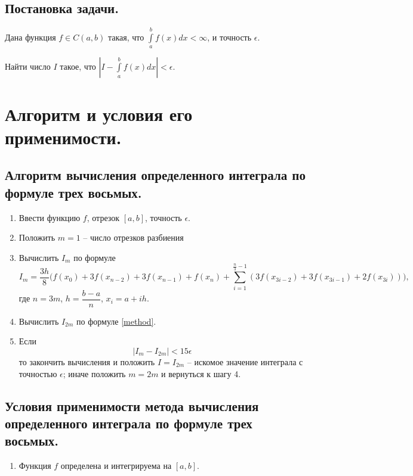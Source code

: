 \documentclass[a4paper, 12pt]{article}
\begin{document}
	\subsection{Постановка задачи.}
	
	Дана функция $f\in C(a,b)$ такая, что $\int\limits_a^bf(x)dx<\infty$, и точность $\epsilon$. 
	
	Найти число $I$ такое, что $|I-\int\limits_a^bf(x)dx|<\epsilon$.
	
	\section{Алгоритм и условия его применимости.}
	
	\subsection{Алгоритм вычисления определенного интеграла по формуле трех восьмых.}
	
	\begin{enumerate}
		\item Ввести функцию $f$, отрезок $[a,b]$, точность $\epsilon$.
		\item Положить $m=1$ -- число отрезков разбиения
		\item Вычислить $I_m$ по формуле
		\begin{equation} \label{method}
			I_m=\frac{3h}{8}\bigg(f(x_0)+3f(x_{n-2})+3f(x_{n-1})+f(x_n)+\sum\limits_{i=1}^{\frac{n}{3}-1}(3f(x_{3i-2})+3f(x_{3i-1})+2f(x_{3i}))\bigg),
		\end{equation}
		где $n=3m$, $h=\dfrac{b-a}{n}$, $x_i=a+ih$.
		\item Вычислить $I_{2m}$ по формуле \eqref{method}.
		\item Если
		\begin{equation}
			|I_m-I_{2m}|<15\epsilon
		\end{equation}
		то закончить вычисления и положить $I=I_{2m}$ -- искомое значение интеграла с точностью $\epsilon$; иначе положить $m=2m$ и вернуться к шагу 4.
	\end{enumerate}
	
	\subsection{Условия применимости метода вычисления определенного интеграла по формуле трех восьмых.}
	
	\begin{enumerate}
		\item Функция $f$ определена и интегрируема на $[a,b]$.
	\end{enumerate}
	
\end{document}
